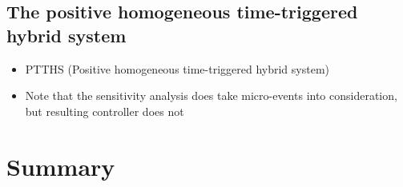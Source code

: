 \documentclass[../DC2017114Bouma.tex]{subfiles}
\begin{document}
\subsection{The positive homogeneous time-triggered hybrid system}




\begin{itemize}
\item PTTHS (Positive homogeneous time-triggered hybrid system)
\item Note that the sensitivity analysis does take micro-events into consideration, but resulting controller does not
\end{itemize}
%
%
%
%
%
%

\section{Summary}
\end{document}
